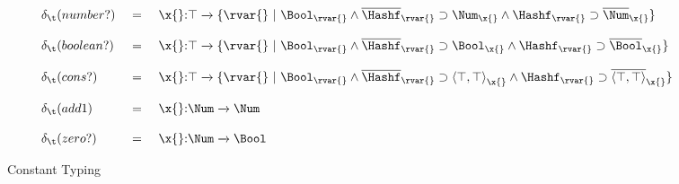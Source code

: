\begin{figure*}
$$
\begin{array}{lclr}
\constanttypealign 
  {\numberhuh} 
  {\ArrowJustType 
    {\x{}} {\top} 
    {\refinenotype {\rvar{}} 
      {\andpropthree
        {\isprop {\Bool} {\rvar{}}}
        {\impprop {\notprop {\Hashf} {\rvar{}}}
                  {\isprop {\Num} {\x{}}}}
        {\impprop {\isprop {\Hashf} {\rvar{}}}
                  {\notprop {\Num} {\x{}}}}}}}
\\\\
\constanttypealign 
  {\booleanhuh} 
  {\ArrowJustType 
    {\x{}} {\top} 
    {\refinenotype {\rvar{}} 
      {\andpropthree
        {\isprop {\Bool} {\rvar{}}}
        {\impprop {\notprop {\Hashf} {\rvar{}}}
                  {\isprop {\Bool} {\x{}}}}
        {\impprop {\isprop {\Hashf} {\rvar{}}}
                  {\notprop {\Bool} {\x{}}}}}}}
\\\\
\constanttypealign 
  {\conshuh} 
  {\ArrowJustType 
    {\x{}} {\top} 
    {\refinenotype {\rvar{}} 
      {\andpropthree
        {\isprop {\Bool} {\rvar{}}}
        {\impprop {\notprop {\Hashf} {\rvar{}}}
                  {\isprop {\Cons {\top} {\top}} {\x{}}}}
        {\impprop {\isprop {\Hashf} {\rvar{}}}
                  {\notprop {\Cons {\top} {\top}} {\x{}}}}}}}
\\\\
\constanttypealign 
  {\addone} 
  {\ArrowJustType 
    {\x{}} {\Num} {\Num}}
\\\\
\constanttypealign 
  {\zerohuh} 
  {\ArrowJustType 
    {\x{}} {\Num} {\Bool}}
\end{array}
$$
\caption{Constant Typing}
\end{figure*}
